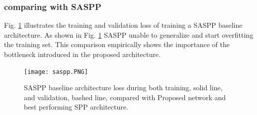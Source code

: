 \subsubsection{comparing with SASPP}
Fig. \ref{saspp} illustrates the training and validation loss of training a SASPP baseline architecture. As shown in Fig. \ref{saspp} SASPP unable to generalize and start overfitting the training set. This comparison empirically shows the importance of the bottleneck introduced in the proposed architecture.

\begin{center}
\begin{figure}[htbp]
\centerline{\texttt{[image: saspp.PNG]}}
\caption{SASPP baseline architecture loss during both training, solid line, and validation, bashed line, compared with Proposed network and best performing SPP architecture.}
\label{saspp}
\end{figure}
\end{center}

